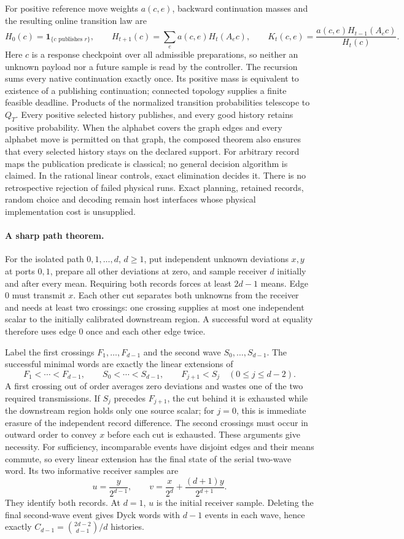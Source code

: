 For positive reference move weights $a(c,e)$, backward continuation masses
and the resulting online transition law are
\[
 H_0(c)=\mathbf1_{\{c\text{ publishes }r\}},\qquad
 H_{t+1}(c)=\sum_e a(c,e)H_t(A_ec),\qquad
 K_t(c,e)=\frac{a(c,e)H_{t-1}(A_ec)}{H_t(c)}.
\]
Here $c$ is a response checkpoint over all admissible preparations, so
neither an unknown payload nor a future sample is read by the controller.
The recursion sums every native continuation exactly once. Its positive
mass is equivalent to existence of a publishing continuation; connected
topology supplies a finite feasible deadline. Products of the normalized
transition probabilities telescope to $Q_T$. Every positive selected
history publishes, and every good history retains positive probability.
When the alphabet covers the graph edges and every alphabet move is
permitted on that graph, the composed theorem also ensures that every
selected history stays on the declared support. For arbitrary record maps
the publication predicate is classical; no general decision algorithm is
claimed. In the rational linear controls, exact elimination decides it.
There is no retrospective rejection of failed physical runs. Exact
planning, retained records, random choice and decoding remain host
interfaces whose physical implementation cost is unsupplied.

\paragraph{A sharp path theorem.}
For the isolated path $0,1,\ldots,d$, $d\geq1$, put independent unknown
deviations $x,y$ at ports $0,1$, prepare all other deviations at zero, and
sample receiver $d$ initially and after every mean. Requiring both records
forces at least $2d-1$ means. Edge $0$ must transmit $x$. Each other cut
separates both unknowns from the receiver and needs at least two crossings:
one crossing supplies at most one independent scalar to the initially
calibrated downstream region. A successful word at equality therefore uses
edge $0$ once and each other edge twice.

Label the first crossings $F_1,\ldots,F_{d-1}$ and the second wave
$S_0,\ldots,S_{d-1}$. The successful minimal words are exactly the linear
extensions of
\[
 F_1<\cdots<F_{d-1},\qquad S_0<\cdots<S_{d-1},
 \qquad F_{j+1}<S_j\quad(0\leq j\leq d-2).
\]
A first crossing out of order averages zero deviations and wastes one of
the two required transmissions. If $S_j$ precedes $F_{j+1}$, the cut behind
it is exhausted while the downstream region holds only one source scalar;
for $j=0$, this is immediate erasure of the independent record difference.
The second crossings must occur in outward order to convey $x$ before each
cut is exhausted. These arguments give necessity. For sufficiency,
incomparable events have disjoint edges and their means commute, so every
linear extension has the final state of the serial two-wave word. Its two
informative receiver samples are
\[
 u=\frac{y}{2^{d-1}},\qquad
 v=\frac{x}{2^d}+\frac{(d+1)y}{2^{d+1}}.
\]
They identify both records. At $d=1$, $u$ is the initial receiver sample.
Deleting the final second-wave event gives Dyck words with $d-1$ events in
each wave, hence exactly $C_{d-1}=\binom{2d-2}{d-1}/d$ histories.

